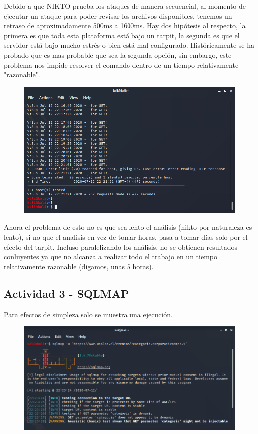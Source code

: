 \documentclass[11pt]{utalcaDoc}
\begin{document}
Debido a que NIKTO prueba los ataques de manera secuencial, al momento de ejecutar un ataque para poder revisar los archivos disponibles, tenemos un retraso de aproximadamente 500ms a 1600ms. Hay dos hipótesis al respecto, la primera es que toda esta plataforma está bajo un tarpit, la segunda es que el servidor está bajo mucho estrés o bien está mal configurado. Históricamente se ha probado que es mas probable que sea la segunda opción, sin embargo, este problema nos impide resolver el comando dentro de un tiempo relativamente "razonable". 


\begin{figure}[H]
	\centering
	\includegraphics[width=.75\textwidth]{images2/nikto3.png}
\end{figure}

Ahora el problema de esto no es que sea lento el análisis (nikto por naturaleza es lento), si no que el analisis en vez de tomar horas, pasa a tomar días solo por el efecto del tarpit. Incluso paralelizando los análisis, no se obtienen resultados conluyentes ya que no alcanza a realizar todo el trabajo en un tiempo relativamente razonable (digamos, unas 5 horas).



\subsection{Actividad 3 - SQLMAP}
Para efectos de simpleza solo se muestra una ejecución.

\begin{figure}[H]
	\centering
	\includegraphics[width=.75\textwidth]{images2/sqlmap1.png}
\end{figure}
\end{document}
